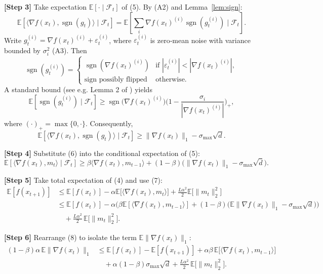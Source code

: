 \documentclass[11pt]{article}
\begin{document}
\noindent\textbf{[Step 3]} Take expectation $\mathbb{E}[\cdot\mid\mathcal{F}_{t}]$ of (5). By (A2) and Lemma~\ref{lem:sign}:
\[
    \mathbb{E}\!\left[\langle \nabla f(x_{t}),\operatorname{sgn}(g_{t})\rangle\mid\mathcal{F}_{t}\right]
    = \mathbb{E}\!\left[\sum_{i}\nabla f(x_{t})^{(i)}\operatorname{sgn}(g_{t}^{(i)})\mid\mathcal{F}_{t}\right].
\]
Write $g_{t}^{(i)} = \nabla f(x_{t})^{(i)} + \varepsilon_{t}^{(i)}$, where $\varepsilon_{t}^{(i)}$ is zero‑mean noise with variance bounded by $\sigma_{i}^{2}$ (A3). Then
\[
    \operatorname{sgn}(g_{t}^{(i)}) = 
    \begin{cases}
        \operatorname{sgn}(\nabla f(x_{t})^{(i)}) & \text{if } |\varepsilon_{t}^{(i)}|<|\nabla f(x_{t})^{(i)}|,\\
        \text{sign possibly flipped} & \text{otherwise}.
    \end{cases}
\]
A standard bound (see e.g. Lemma 2 of \cite{Bernstein2020}) yields
\[
    \mathbb{E}\!\left[\operatorname{sgn}(g_{t}^{(i)})\mid\mathcal{F}_{t}\right]\ge
    \operatorname{sgn}\!\big(\nabla f(x_{t})^{(i)}\big)\Big(1-\frac{\sigma_{i}}{|\nabla f(x_{t})^{(i)}|}\Big)_{+},
\]
where $(\cdot)_{+}=\max\{0,\cdot\}$. Consequently,
\[
    \mathbb{E}\!\left[\langle \nabla f(x_{t}),\operatorname{sgn}(g_{t})\rangle\mid\mathcal{F}_{t}\right]
    \ge \|\nabla f(x_{t})\|_{1} - \sigma_{\max}\sqrt{d}. \tag{6}
\]

\noindent\textbf{[Step 4]} Substitute (6) into the conditional expectation of (5):
\[
    \mathbb{E}\!\left[\langle \nabla f(x_{t}), m_{t}\rangle\mid\mathcal{F}_{t}\right]
    \ge \beta\langle \nabla f(x_{t}), m_{t-1}\rangle
      + (1-\beta)\Big(\|\nabla f(x_{t})\|_{1} - \sigma_{\max}\sqrt{d}\Big). \tag{7}
\]

\noindent\textbf{[Step 5]} Take total expectation of (4) and use (7):
\[
\begin{aligned}
    \mathbb{E}[f(x_{t+1})] 
    &\le \mathbb{E}[f(x_{t})] -\alpha\mathbb{E}\!\big[\langle \nabla f(x_{t}), m_{t}\rangle\big] + \frac{L\alpha^{2}}{2}\mathbb{E}\!\big[\|m_{t}\|_{2}^{2}\big] \\
    &\le \mathbb{E}[f(x_{t})] -\alpha\Big(\beta\mathbb{E}[\langle \nabla f(x_{t}), m_{t-1}\rangle] + (1-\beta)\big(\mathbb{E}\|\nabla f(x_{t})\|_{1} - \sigma_{\max}\sqrt{d}\big)\Big) \\
    &\quad + \frac{L\alpha^{2}}{2}\, \mathbb{E}\!\big[\|m_{t}\|_{2}^{2}\big]. \tag{8}
\end{aligned}
\]

\noindent\textbf{[Step 6]} Rearrange (8) to isolate the term $\mathbb{E}\|\nabla f(x_{t})\|_{1}$:
\[
\begin{aligned}
    (1-\beta)\alpha\,\mathbb{E}\|\nabla f(x_{t})\|_{1}
    &\le \mathbb{E}[f(x_{t})]-\mathbb{E}[f(x_{t+1})] 
      +\alpha\beta\,\mathbb{E}\!\big[\langle \nabla f(x_{t}), m_{t-1}\rangle\big] \\
    &\quad +\alpha(1-\beta)\sigma_{\max}\sqrt{d}
      +\frac{L\alpha^{2}}{2}\,\mathbb{E}\!\big[\|m_{t}\|_{2}^{2}\big]. \tag{9}
\end{aligned}
\]
\end{document}
